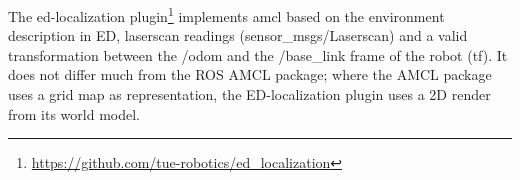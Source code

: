 The \acrshort{ed}-localization plugin\footnote{\url{https://github.com/tue-robotics/ed_localization}} implements \acrshort{amcl} based on the environment description in ED, laserscan readings (sensor\_msgs/Laserscan) and a valid transformation between the /odom and the /base\_link frame of the robot (tf). It does not differ much from the ROS AMCL package; where the AMCL package uses a grid map as representation, the ED-localization plugin uses a 2D render from its world model. 